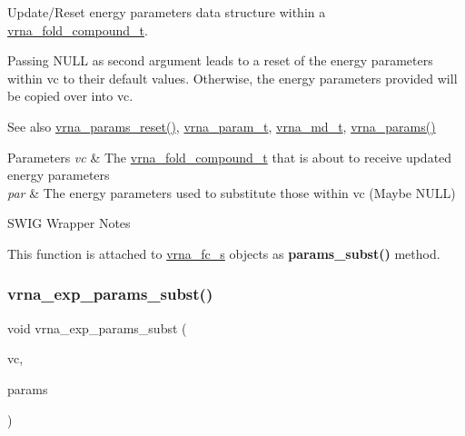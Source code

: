 Update/\+Reset energy parameters data structure within a \mbox{\hyperlink{group__fold__compound_ga1b0cef17fd40466cef5968eaeeff6166}{vrna\+\_\+fold\+\_\+compound\+\_\+t}}. 

Passing N\+U\+LL as second argument leads to a reset of the energy parameters within vc to their default values. Otherwise, the energy parameters provided will be copied over into vc.

\begin{DoxySeeAlso}{See also}
\mbox{\hyperlink{group__energy__parameters_gac40dc82e48a72a97cfc58b9da08a7792}{vrna\+\_\+params\+\_\+reset()}}, \mbox{\hyperlink{group__energy__parameters_ga8a69ca7d787e4fd6079914f5343a1f35}{vrna\+\_\+param\+\_\+t}}, \mbox{\hyperlink{group__model__details_ga1f8a10e12a0a1915f2a4eff0b28ea17c}{vrna\+\_\+md\+\_\+t}}, \mbox{\hyperlink{group__energy__parameters_gad0e3e7e74bdc50d1709d40c92993185e}{vrna\+\_\+params()}}
\end{DoxySeeAlso}

\begin{DoxyParams}{Parameters}
{\em vc} & The \mbox{\hyperlink{group__fold__compound_ga1b0cef17fd40466cef5968eaeeff6166}{vrna\+\_\+fold\+\_\+compound\+\_\+t}} that is about to receive updated energy parameters \\
\hline
{\em par} & The energy parameters used to substitute those within vc (Maybe N\+U\+LL)\\
\hline
\end{DoxyParams}
\begin{DoxyRefDesc}{S\+W\+I\+G Wrapper Notes}
\item[\mbox{\hyperlink{wrappers__wrappers000094}{S\+W\+I\+G Wrapper Notes}}]This function is attached to \mbox{\hyperlink{group__fold__compound_structvrna__fc__s}{vrna\+\_\+fc\+\_\+s}} objects as {\bfseries{params\+\_\+subst()}} method. \end{DoxyRefDesc}
\mbox{\label{group__energy__parameters_ga8e7ac4fab3b0cc03afbc134eaafb3525}} 
\subsubsection{\texorpdfstring{vrna\_exp\_params\_subst()}{vrna\_exp\_params\_subst()}}
{\footnotesize\ttfamily void vrna\+\_\+exp\+\_\+params\+\_\+subst (\begin{DoxyParamCaption}\item[{\mbox{\hyperlink{group__fold__compound_ga1b0cef17fd40466cef5968eaeeff6166}{vrna\+\_\+fold\+\_\+compound\+\_\+t}} $\ast$}]{vc,  }\item[{\mbox{\hyperlink{group__energy__parameters_ga01d8b92fe734df8d79a6169482c7d8d8}{vrna\+\_\+exp\+\_\+param\+\_\+t}} $\ast$}]{params }\end{DoxyParamCaption})}



